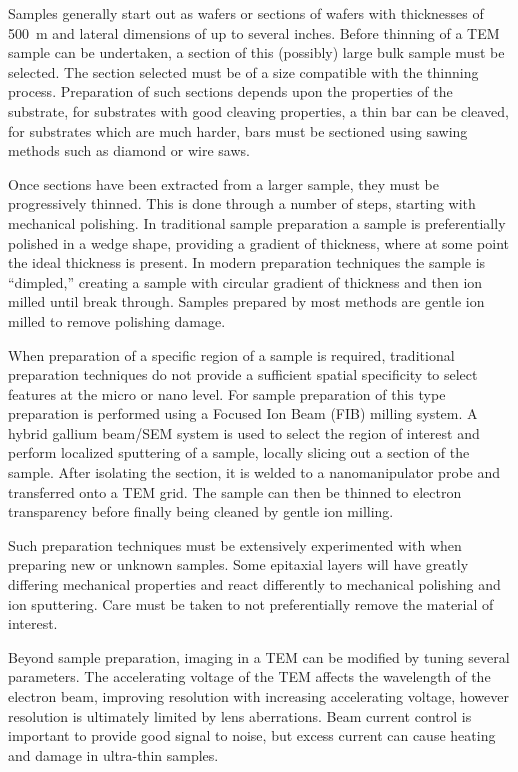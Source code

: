 Samples generally start out as wafers or sections of wafers with thicknesses of 500~\micro{}m and lateral dimensions of up to several inches. Before thinning of a TEM sample can be undertaken, a section of this (possibly) large bulk sample must be selected. The section selected must be of a size compatible with the thinning process. Preparation of such sections depends upon the properties of the substrate, for substrates with good cleaving properties, a thin bar can be cleaved, for substrates which are much harder, bars must be sectioned using sawing methods such as diamond or wire saws.

Once sections have been extracted from a larger sample, they must be progressively thinned. This is done through a number of steps, starting with mechanical polishing. In traditional sample preparation a sample is preferentially polished in a wedge shape, providing a gradient of thickness, where at some point the ideal thickness is present. In modern preparation techniques the sample is ``dimpled,'' creating a sample with circular gradient of thickness and then ion milled until break through. Samples prepared by most methods are gentle ion milled to remove polishing damage.

When preparation of a specific region of a sample is required, traditional preparation techniques do not provide a sufficient spatial specificity to select features at the micro or nano level. For sample preparation of this type preparation is performed using a Focused Ion Beam (FIB) milling system. A hybrid gallium beam/SEM system is used to select the region of interest and perform localized sputtering of a sample, locally slicing out a section of the sample. After isolating the section, it is welded to a nanomanipulator probe and transferred onto a TEM grid. The sample can then be thinned to electron transparency before finally being cleaned by gentle ion milling.

Such preparation techniques must be extensively experimented with when preparing new or unknown samples. Some epitaxial layers will have greatly differing mechanical properties and react differently to mechanical polishing and ion sputtering. Care must be taken to not preferentially remove the material of interest.

Beyond sample preparation, imaging in a TEM can be modified by tuning several parameters. The accelerating voltage of the TEM affects the wavelength of the electron beam, improving resolution with increasing accelerating voltage, however resolution is ultimately limited by lens aberrations. Beam current control is important to provide good signal to noise, but excess current can cause heating and damage in ultra-thin samples.

